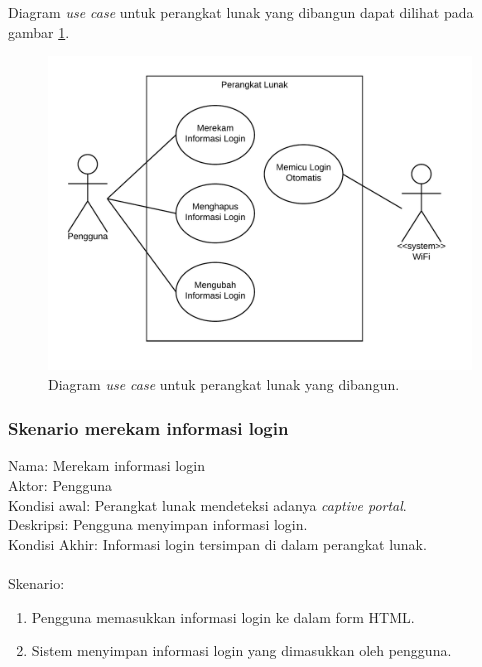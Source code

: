 Diagram \textit{use case} untuk perangkat lunak yang dibangun dapat dilihat pada gambar \ref{fig:usecase}.

\begin{figure}[h]
    \centering
    \includegraphics[scale=0.77]{Gambar/usecase.png}
    \caption[Diagram \textit{use case} untuk perangkat lunak yang dibangun.]{Diagram \textit{use case} untuk perangkat lunak yang dibangun.}
    \label{fig:usecase}
\end{figure}

\subsubsection{Skenario merekam informasi login}
Nama: Merekam informasi login\\
Aktor: Pengguna\\
Kondisi awal: Perangkat lunak mendeteksi adanya \textit{captive portal}.\\
Deskripsi: Pengguna menyimpan informasi login.\\
Kondisi Akhir: Informasi login tersimpan di dalam perangkat lunak.\\\\
Skenario:
\begin{enumerate}
    \item{Pengguna memasukkan informasi login ke dalam form HTML.}
    \item{Sistem menyimpan informasi login yang dimasukkan oleh pengguna.}
\end{enumerate}

